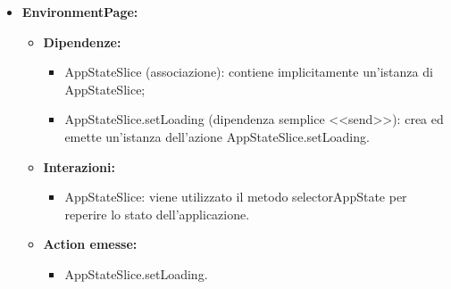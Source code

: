 \begin{itemize}
    \item \textbf{EnvironmentPage:}
    \begin{itemize}
        \item \textbf{Dipendenze:}
        \begin{itemize}
            \item AppStateSlice (associazione): contiene implicitamente un'istanza di AppStateSlice;
            \item AppStateSlice.setLoading (dipendenza semplice <<send>>): crea ed emette un’istanza dell’azione AppStateSlice.setLoading.
        \end{itemize} 
        \item \textbf{Interazioni:}
        \begin{itemize}
            \item AppStateSlice: viene utilizzato il metodo selectorAppState per reperire lo stato dell'applicazione.
        \end{itemize}  
        \item \textbf{Action emesse:}
        \begin{itemize}
            \item AppStateSlice.setLoading.
        \end{itemize} 
    \end{itemize}
\end{itemize}


